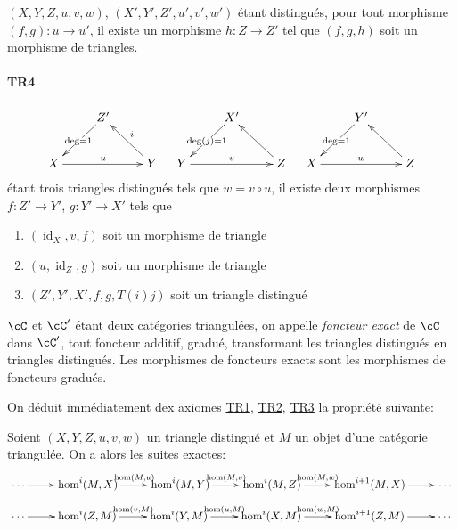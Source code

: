 $(X,Y,Z,u,v,w)$, $(X',Y',Z',u',v',w')$ étant distingués, pour tout 
morphisme $(f,g):u\to u'$, il existe un morphisme $h:Z\to Z'$ tel que $(f,g,h)$ 
soit un morphisme de triangles. 


\paragraph*{TR4}
\label{VIII:TR4}

\[\xymatrix{
  & Z' \ar[dl]|{\deg=1} \\
  X \ar[rr]^-u 
    & & Y \ar[ul]_-i 
}\quad
\xymatrix{
  & X' \ar[dl]|{\deg(j)=1} \\
  Y \ar[rr]^-v 
    & & Z \ar[ul] 
}\quad
\xymatrix{
  & Y' \ar[dl]|{\deg=1} \\
  X \ar[rr]^-w 
    & & Z \ar[ul] 
}\]
étant trois triangles distingués tels que $w=v\circ u$, il existe deux 
morphismes $f:Z'\to Y'$, $g:Y' \to X'$ tels que 
\begin{enumerate}
  \item $(\operatorname{id}_X, v, f)$ soit un morphisme de triangle 
  \item $(u,\operatorname{id}_Z,g)$ soit un morphisme de triangle 
  \item $(Z',Y',X',f,g,T(i) j)$ soit un triangle distingué
\end{enumerate}

$\cC$ et $\cC'$ étant deux catégories triangulées, on appelle 
\emph{foncteur exact} de $\cC$ dans $\cC'$, tout foncteur additif, gradué, 
transformant les triangles distingués en triangles distingués. Les 
morphismes de foncteurs exacts sont les morphismes de foncteurs gradués. 

On déduit immédiatement dex axiomes \hyperref[VIII:TR1]{TR1}, 
\hyperref[VIII:TR2]{TR2}, \hyperref[VIII:TR3]{TR3} la propriété suivante: 





\begin{proposition}\label{VIII:1-1-2}
Soient $(X,Y,Z,u,v,w)$ un triangle distingué et $M$ un objet d'une 
catégorie triangulée. On a alors les suites exactes: 
\[\xymatrix{
  \cdots \ar[r] 
    & \hom^i(M,X) \ar[r]^-{\hom(M,u)} 
    & \hom^i(M,Y) \ar[r]^-{\hom(M,v)} 
    & \hom^i(M,Z) \ar[r]^-{\hom(M,w)} 
    & \hom^{i+1}(M,X) \ar[r] 
    & \cdots
}\]
\[\xymatrix{
  \cdots \ar[r] 
    & \hom^i(Z,M) \ar[r]^-{\hom(v,M)} 
    & \hom^i(Y,M) \ar[r]^-{\hom(u,M)} 
    & \hom^i(X,M) \ar[r]^-{\hom(w,M)} 
    & \hom^{i+1}(Z,M) \ar[r] 
    & \cdots
}\]
\end{proposition}

